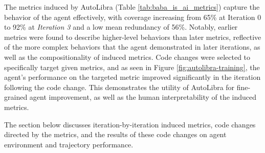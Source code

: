 The metrics induced by AutoLibra (Table \ref{tab:baba_is_ai_metrics}) capture the behavior of the agent effectively, with coverage increasing from 65\% at Iteration 0 to 92\% at \emph{Iteration 3} and a low mean redundancy of 56\%. Notably, earlier metrics were found to describe higher-level behaviors than later metrics, reflective of the more complex behaviors that the agent demonstrated in later iterations, as well as the compositionality of induced metrics. Code changes were selected to specifically target given metrics, and as seen in Figure \ref{fig:autolibra-training}, the agent's performance on the targeted metric improved significantly in the iteration following the code change. This demonstrates the utility of AutoLibra for fine-grained agent improvement, as well as the human interpretability of the induced metrics.

The section below discusses iteration-by-iteration induced metrics, code changes directed by the metrics, and the results of these code changes on agent environment and trajectory performance.

